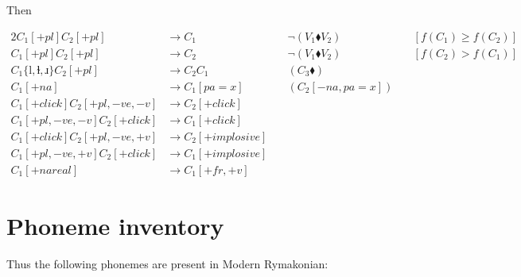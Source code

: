 \documentclass{book}
\newcommand{\lname}{Modern Rymakonian}
\begin{document}
Then

\begin{alignat*}{2}
  C_1[+pl] C_2[+pl] &\rightarrow C_1 &\quad \lnot(V_1 \blacklozenge V_2) &\quad[f(C_1) \ge f(C_2)] \\
  C_1[+pl] C_2[+pl] &\rightarrow C_2 &\quad \lnot(V_1 \blacklozenge V_2) &\quad[f(C_2) > f(C_1)] \\
  C_1\{\text{l}, \text{ɫ}, \text{ɹ}\} C_2[+pl] &\rightarrow C_2 C_1 &\quad(C_3 \blacklozenge) \\
  C_1[+na] &\rightarrow C_1[pa=x] &\quad(C_2[-na,pa=x]) \\
  C_1[+click] C_2[+pl, -ve, -v] &\rightarrow C_2[+click] \\
  C_1[+pl, -ve, -v] C_2[+click] &\rightarrow C_1[+click] \\
  C_1[+click] C_2[+pl, -ve, +v] &\rightarrow C_2[+implosive] \\
  C_1[+pl, -ve, +v] C_2[+click] &\rightarrow C_1[+implosive] \\
  C_1[+nareal] &\rightarrow C_1[+fr, +v]
\end{alignat*}

\section{Phoneme inventory}

Thus the following phonemes are present in \lname:
\end{document}

